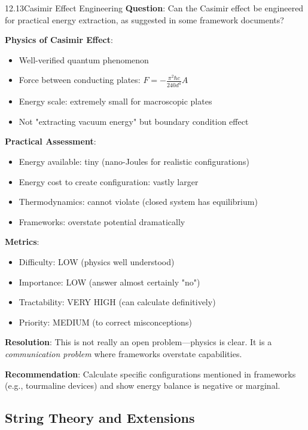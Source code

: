 \begin{openproblem}{12.13}{Casimir Effect Engineering}
\textbf{Question}: Can the Casimir effect be engineered for practical energy extraction, as suggested in some framework documents?

\textbf{Physics of Casimir Effect}:
\begin{itemize}
    \item Well-verified quantum phenomenon
    \item Force between conducting plates: $F = -\frac{\pi^2 \hbar c}{240 d^4} A$
    \item Energy scale: extremely small for macroscopic plates
    \item Not "extracting vacuum energy" but boundary condition effect
\end{itemize}

\textbf{Practical Assessment}:
\begin{itemize}
    \item Energy available: tiny (nano-Joules for realistic configurations)
    \item Energy cost to create configuration: vastly larger
    \item Thermodynamics: cannot violate (closed system has equilibrium)
    \item Frameworks: overstate potential dramatically
\end{itemize}

\textbf{Metrics}:
\begin{itemize}
    \item Difficulty: LOW (physics well understood)
    \item Importance: LOW (answer almost certainly "no")
    \item Tractability: VERY HIGH (can calculate definitively)
    \item Priority: MEDIUM (to correct misconceptions)
\end{itemize}

\textbf{Resolution}: This is not really an open problem---physics is clear. It is a \textit{communication problem} where frameworks overstate capabilities.

\textbf{Recommendation}: Calculate specific configurations mentioned in frameworks (e.g., tourmaline devices) and show energy balance is negative or marginal.
\end{openproblem}

\subsection{String Theory and Extensions}

